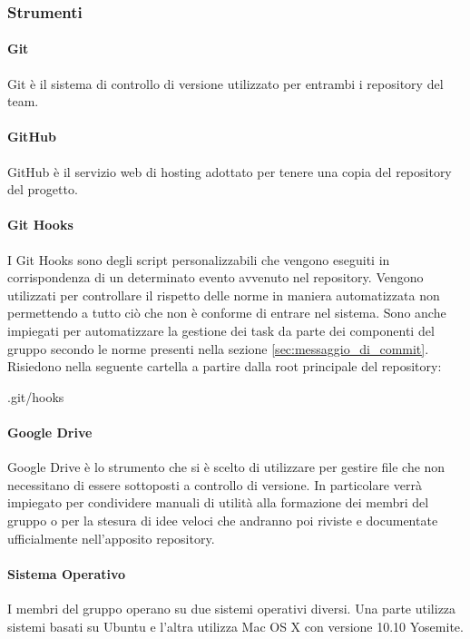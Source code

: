 		\subsubsection{Strumenti}
			\paragraph{Git}
			Git è il sistema di controllo di versione utilizzato per entrambi i repository del team.

			\paragraph{GitHub}
			GitHub è il servizio web di hosting adottato per tenere una copia del repository del progetto.

			\paragraph{Git Hooks}
			I Git Hooks sono degli script personalizzabili che vengono eseguiti in corrispondenza di un determinato evento avvenuto nel repository. \newline
			Vengono utilizzati per controllare il rispetto delle norme in maniera automatizzata non permettendo a tutto ciò che non è conforme di entrare nel sistema. \newline
			Sono anche impiegati per automatizzare la gestione dei task da parte dei componenti del gruppo secondo le norme presenti nella sezione \ref{sec:messaggio_di_commit}. \newline
			Risiedono nella seguente cartella a partire dalla root principale del repository:
				\begin{center}
					.git/hooks
				\end{center}

			\paragraph{Google Drive}
			\label{sec:google_drive}
			Google Drive è lo strumento che si è scelto di utilizzare per gestire file che non necessitano di essere sottoposti a controllo di versione. \newline
			In particolare verrà impiegato per condividere manuali di utilità alla formazione dei membri del gruppo o per la stesura di idee veloci che andranno poi riviste e documentate ufficialmente nell'apposito repository.

			\paragraph{Sistema Operativo}
			I membri del gruppo operano su due sistemi operativi diversi. \newline
			Una parte utilizza sistemi basati su Ubuntu e l'altra utilizza Mac OS X con versione 10.10 Yosemite.

